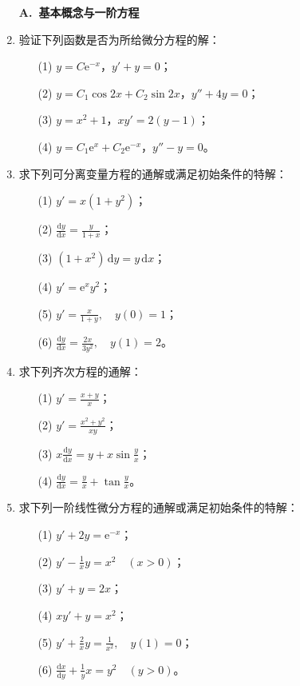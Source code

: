 \documentclass[fontset=fandol]{ctexart}
\newcommand{\dd}{\mathrm{d}}
\newcommand{\ee}{\mathrm{e}}
\begin{document}
\begin{enumerate}
\item[]\textbf{A.\ 基本概念与一阶方程}
\item 验证下列函数是否为所给微分方程的解：
\begin{enumerate}
\item[(1)] $y=C\ee^{-x}$，\quad $y'+y=0$；
\item[(2)] $y=C_1\cos2x+C_2\sin2x$，\quad $y''+4y=0$；
\item[(3)] $y=x^2+1$，\quad $xy'=2(y-1)$；
\item[(4)] $y=C_1\ee^x+C_2\ee^{-x}$，\quad $y''-y=0$。
\end{enumerate}

\item 求下列可分离变量方程的通解或满足初始条件的特解：
\begin{enumerate}
\item[(1)] $y'=x(1+y^2)$；
\item[(2)] $\displaystyle \frac{\dd y}{\dd x}=\frac{y}{1+x}$；
\item[(3)] $(1+x^2)\,\dd y=y\,\dd x$；
\item[(4)] $y'=\ee^x y^2$；
\item[(5)] $\displaystyle y'=\frac{x}{1+y},\quad y(0)=1$；
\item[(6)] $\displaystyle \frac{\dd y}{\dd x}=\frac{2x}{3y^2},\quad y(1)=2$。
\end{enumerate}

\item 求下列齐次方程的通解：
\begin{enumerate}
\item[(1)] $\displaystyle y'=\frac{x+y}{x}$；
\item[(2)] $\displaystyle y'=\frac{x^2+y^2}{xy}$；
\item[(3)] $\displaystyle x\frac{\dd y}{\dd x}=y+x\sin\frac yx$；
\item[(4)] $\displaystyle \frac{\dd y}{\dd x}=\frac{y}{x}+\tan\frac yx$。
\end{enumerate}

\item 求下列一阶线性微分方程的通解或满足初始条件的特解：
\begin{enumerate}
\item[(1)] $\displaystyle y'+2y=\ee^{-x}$；
\item[(2)] $\displaystyle y'-\frac1x y=x^2\quad(x>0)$；
\item[(3)] $\displaystyle y'+y=2x$；
\item[(4)] $\displaystyle xy'+y=x^2$；
\item[(5)] $\displaystyle y'+\frac{2}{x}y=\frac1{x^2},\quad y(1)=0$；
\item[(6)] $\displaystyle \frac{\dd x}{\dd y}+\frac1y x=y^2\quad(y>0)$。
\end{enumerate}


\end{enumerate}
\end{document}
